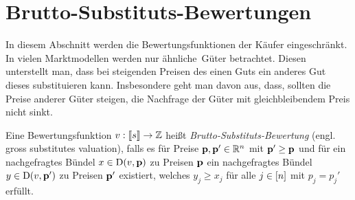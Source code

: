 \section{Brutto-Substituts-Bewertungen}

In diesem Abschnitt werden die Bewertungsfunktionen der Käufer eingeschränkt.
In vielen Marktmodellen werden nur \glqq ähnliche\grqq\ Güter betrachtet.
Diesen unterstellt man, dass bei steigenden Preisen des einen Guts ein anderes Gut dieses substituieren kann.
Insbesondere geht man davon aus, dass, sollten die Preise anderer Güter steigen, die Nachfrage der Güter mit gleichbleibendem Preis nicht sinkt.

\iffalse
\begin{definition}[Diskret-Konkave Funktion]
	Eine Funktion $v: \ffirst{\fs}^n \rightarrow \Z$ heißt \emph{diskret-konkav}, falls lokale Minima auch global minimal sind, also falls für alle Preise $\fp\in\R^n$ und Bündel $x\in\ffirst{\fs}^n$ mit \begin{align*}
	&v(x) \geq \max_{i : x_i>0} v(x - e_i) + p_i, \qquad
	&v(x) \geq \max_{j:x_j < s_j} v(x + e_j) - p_j, \\
	&v(x) \geq \max_{\substack{i: x_i>0 \\ j: x_j < s_j}} v(x + e_i - e_j) - p_i + p-j
	\end{align*}
	bereits $x\in\NB(v, \fp)$ gilt.
\end{definition}
\fi

\begin{definition}
Eine Bewertungsfunktion $v: \left\llbracket s \right\rrbracket \rightarrow \mathbb{Z}$ heißt \emph{Brutto-Substituts-Bewertung} (engl. gross substitutes valuation), falls es für Preise $\mathbf{p},\mathbf{p}' \in\mathbb{R}^n$ mit $\mathbf{p}' \geq \mathbf{p}$ und für ein nachgefragtes Bündel $x\in\NB(v, \fp)$ zu Preisen $\mathbf{p}$ ein nachgefragtes Bündel $y\in\operatorname{D}(v,\mathbf{p}')$ zu Preisen $\mathbf{p}'$ existiert, welches $y_j \geq x_j$ für alle $j\in\left[ n \right]$ mit $p_j = p_j'$ erfüllt.
\end{definition}

